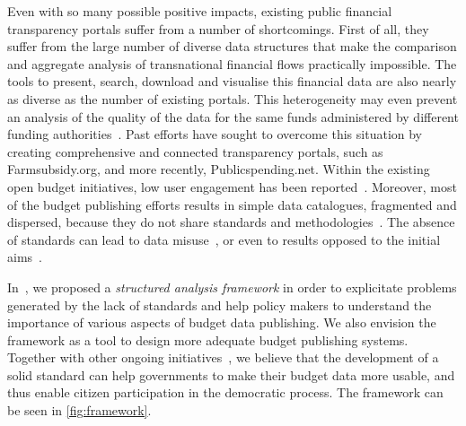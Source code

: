 Even with so many possible positive impacts, existing public financial transparency portals suffer from a number of shortcomings.
First of all, they suffer from the large number of diverse data structures that make the comparison and aggregate analysis of transnational financial flows practically impossible. 
The tools to present, search, download and visualise this financial data are also nearly as diverse as the number of existing portals. 
This heterogeneity may even prevent an analysis of the quality of the data for the same funds administered by different funding authorities~\cite{Vafopoulos2013}. 
Past efforts have sought to overcome this situation by creating comprehensive and connected transparency portals, such as Farmsubsidy.org, and more recently, Publicspending.net.
Within the existing open budget initiatives, low user engagement has been reported~\cite{Worthy2013}. 
Moreover, most of the budget publishing efforts results in simple data catalogues, fragmented and dispersed, because they do not share standards and methodologies~\cite{Vafopoulos2013}. 
The absence of standards can lead to data misuse~\cite{Zuiderwijk2014a}, or even to results opposed to the initial aims~\cite{Gurstein2011}.

In~, we proposed a \emph{structured analysis framework} in order to explicitate problems generated by the lack of standards and help policy makers to understand the importance of various aspects of budget data publishing. We also envision the framework as a tool to design more adequate budget publishing systems. Together with other ongoing initiatives~\cite{OpenSpending,Vlasov2014}, we believe that the development of a solid standard can help governments to make their budget data more usable, and thus enable citizen participation in the democratic process. The framework can be seen in \autoref{fig:framework}.

